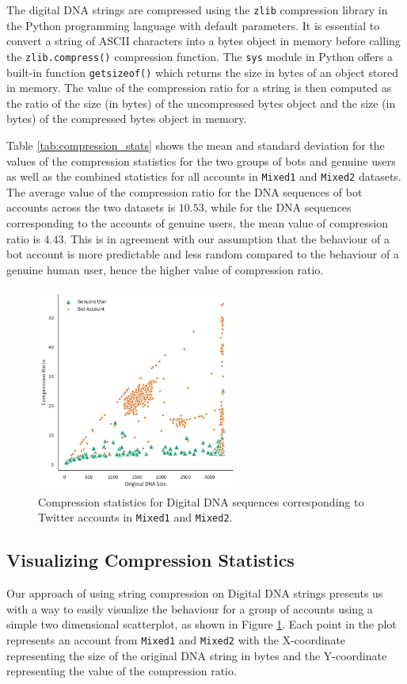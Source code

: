 \documentclass{llncs}
\begin{document}
The digital DNA strings are compressed using the \texttt{zlib} compression library in the Python programming language with default parameters. It is essential to convert a string of ASCII characters into a bytes object in memory before calling the \texttt{zlib.compress()} compression function. The \texttt{sys} module in Python offers a built-in function \texttt{getsizeof()} which returns the size in bytes of an object stored in memory. The value of the compression ratio for a string is then computed as the ratio of the size (in bytes) of the uncompressed bytes object and the size (in bytes) of the compressed bytes object in memory. 

Table \ref{tab:compression_stats} shows the mean and standard deviation for the values of the compression statistics for the two groups of bots and genuine users as well as the combined statistics for all accounts in \texttt{Mixed1} and \texttt{Mixed2} datasets. The average value of the compression ratio for the DNA sequences of bot accounts across the two datasets is $10.53$, while for the DNA sequences corresponding to the accounts of genuine users, the mean value of compression ratio is $4.43$. This is in agreement with our assumption that the behaviour of a bot account is more predictable and less random compared to the behaviour of a genuine human user, hence the higher value of compression ratio.

\begin{figure}
\centering
\includegraphics[width=0.6\textwidth]{figures/dna-scatter-2.pdf}
\caption{Compression statistics for Digital DNA sequences corresponding to Twitter accounts in \texttt{Mixed1} and \texttt{Mixed2}. }
\label{fig:compression_stats}
\end{figure}

\subsection{Visualizing Compression Statistics}
Our approach of using string compression on Digital DNA strings presents us with a way to easily visualize the behaviour for a group of accounts using a simple two dimensional scatterplot, as shown in Figure \ref{fig:compression_stats}. Each point in the plot represents an account from \texttt{Mixed1} and \texttt{Mixed2} with the X-coordinate representing the size of the original DNA string in bytes and the Y-coordinate representing the value of the compression ratio.
\end{document}
